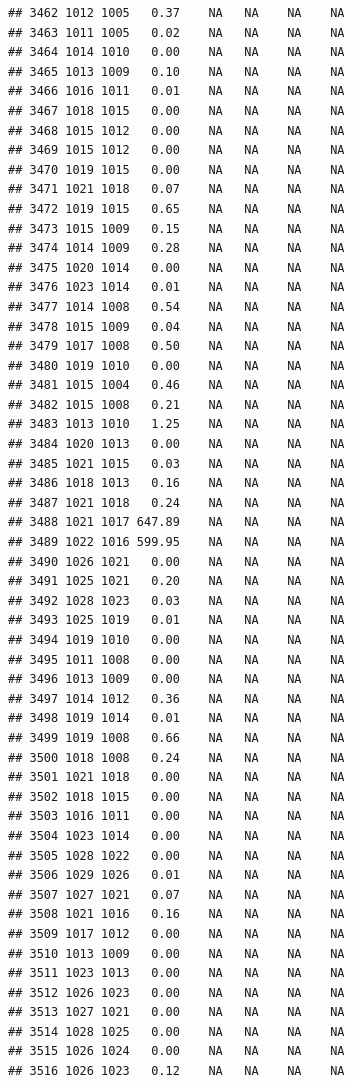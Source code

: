 \documentclass{article}\usepackage{graphicx, color}
\makeatletter
\newenvironment{kframe}{%
 \def\at@end@of@kframe{}%
 \ifinner\ifhmode%
  \def\at@end@of@kframe{\end{minipage}}%
  \begin{minipage}{\columnwidth}%
 \fi\fi%
 \def\FrameCommand##1{\hskip\@totalleftmargin \hskip-\fboxsep
 \colorbox{shadecolor}{##1}\hskip-\fboxsep
     \hskip-\linewidth \hskip-\@totalleftmargin \hskip\columnwidth}%
 \MakeFramed {\advance\hsize-\width
   \@totalleftmargin\z@ \linewidth\hsize
   \@setminipage}}%
 {\par\unskip\endMakeFramed%
 \at@end@of@kframe}
\newenvironment{knitrout}{}{} %
\makeatother
\begin{document}
\begin{knitrout}
\begin{kframe}
\begin{verbatim}
## 3462 1012 1005   0.37    NA   NA    NA    NA
## 3463 1011 1005   0.02    NA   NA    NA    NA
## 3464 1014 1010   0.00    NA   NA    NA    NA
## 3465 1013 1009   0.10    NA   NA    NA    NA
## 3466 1016 1011   0.01    NA   NA    NA    NA
## 3467 1018 1015   0.00    NA   NA    NA    NA
## 3468 1015 1012   0.00    NA   NA    NA    NA
## 3469 1015 1012   0.00    NA   NA    NA    NA
## 3470 1019 1015   0.00    NA   NA    NA    NA
## 3471 1021 1018   0.07    NA   NA    NA    NA
## 3472 1019 1015   0.65    NA   NA    NA    NA
## 3473 1015 1009   0.15    NA   NA    NA    NA
## 3474 1014 1009   0.28    NA   NA    NA    NA
## 3475 1020 1014   0.00    NA   NA    NA    NA
## 3476 1023 1014   0.01    NA   NA    NA    NA
## 3477 1014 1008   0.54    NA   NA    NA    NA
## 3478 1015 1009   0.04    NA   NA    NA    NA
## 3479 1017 1008   0.50    NA   NA    NA    NA
## 3480 1019 1010   0.00    NA   NA    NA    NA
## 3481 1015 1004   0.46    NA   NA    NA    NA
## 3482 1015 1008   0.21    NA   NA    NA    NA
## 3483 1013 1010   1.25    NA   NA    NA    NA
## 3484 1020 1013   0.00    NA   NA    NA    NA
## 3485 1021 1015   0.03    NA   NA    NA    NA
## 3486 1018 1013   0.16    NA   NA    NA    NA
## 3487 1021 1018   0.24    NA   NA    NA    NA
## 3488 1021 1017 647.89    NA   NA    NA    NA
## 3489 1022 1016 599.95    NA   NA    NA    NA
## 3490 1026 1021   0.00    NA   NA    NA    NA
## 3491 1025 1021   0.20    NA   NA    NA    NA
## 3492 1028 1023   0.03    NA   NA    NA    NA
## 3493 1025 1019   0.01    NA   NA    NA    NA
## 3494 1019 1010   0.00    NA   NA    NA    NA
## 3495 1011 1008   0.00    NA   NA    NA    NA
## 3496 1013 1009   0.00    NA   NA    NA    NA
## 3497 1014 1012   0.36    NA   NA    NA    NA
## 3498 1019 1014   0.01    NA   NA    NA    NA
## 3499 1019 1008   0.66    NA   NA    NA    NA
## 3500 1018 1008   0.24    NA   NA    NA    NA
## 3501 1021 1018   0.00    NA   NA    NA    NA
## 3502 1018 1015   0.00    NA   NA    NA    NA
## 3503 1016 1011   0.00    NA   NA    NA    NA
## 3504 1023 1014   0.00    NA   NA    NA    NA
## 3505 1028 1022   0.00    NA   NA    NA    NA
## 3506 1029 1026   0.01    NA   NA    NA    NA
## 3507 1027 1021   0.07    NA   NA    NA    NA
## 3508 1021 1016   0.16    NA   NA    NA    NA
## 3509 1017 1012   0.00    NA   NA    NA    NA
## 3510 1013 1009   0.00    NA   NA    NA    NA
## 3511 1023 1013   0.00    NA   NA    NA    NA
## 3512 1026 1023   0.00    NA   NA    NA    NA
## 3513 1027 1021   0.00    NA   NA    NA    NA
## 3514 1028 1025   0.00    NA   NA    NA    NA
## 3515 1026 1024   0.00    NA   NA    NA    NA
## 3516 1026 1023   0.12    NA   NA    NA    NA

\end{verbatim}
\end{kframe}
\end{knitrout}
\end{document}
